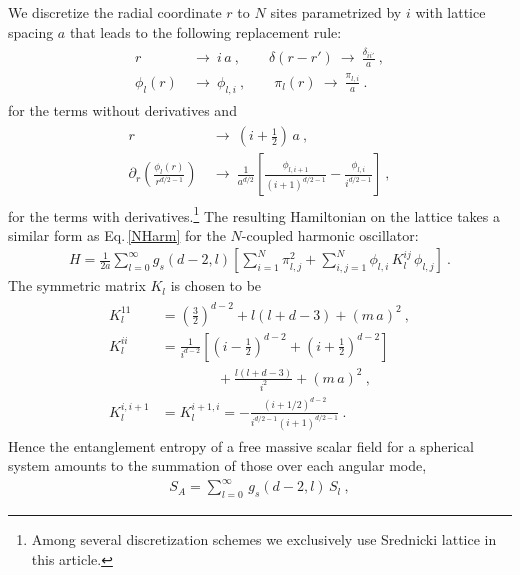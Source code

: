 We discretize the radial coordinate $r$ to $N$ sites parametrized by $i$ with lattice spacing $a$ that leads to the following replacement rule:
\begin{align}
\begin{aligned}
	r& ~\to~ i\, a \ , \qquad \delta(r - r') ~ \to ~ \frac{\delta_{ii'}}{a} \ ,\\
	 \phi_l (r)& ~\to~ \phi_{l,i} \ , \qquad  \pi_l(r) ~\to~ \frac{\pi_{l,i}}{a} \ .
\end{aligned}
\end{align}
for the terms without derivatives and 
\begin{align}
\begin{aligned}
	r& ~\to~ \left(i + \frac{1}{2}\right)\,a \ , \\
	 \partial_r \left( \frac{\phi_l(r)}{r^{d/2 -1}} \right) &~\to~ \frac{1}{a^{d/2}}\left[\frac{\phi_{l,i+1}}{(i+1)^{d/2-1}} - \frac{\phi_{l,i}}{i^{d/2-1}} \right]\ , 
\end{aligned}
\end{align}
for the terms with derivatives.\footnote{Among several discretization schemes we exclusively use Srednicki lattice \cite{Srednicki:1993im} in this article.}
The resulting Hamiltonian on the lattice takes a similar form as Eq.\,\eqref{NHarm} for the $N$-coupled harmonic oscillator:
\begin{align}
	H = \frac{1}{2a} \sum_{l=0}^\infty g_s(d-2,l)  \left[ \sum_{i=1}^N \pi_{l,j}^2 + \sum_{i,j=1}^N \phi_{l,i} \,K_l^{ij} \,\phi_{l,j}\right] \ .
\end{align}
The symmetric matrix $K_l$ is chosen to be
\begin{align}
\begin{aligned}
		K_l^{11} &= \left( \frac{3}{2}\right)^{d-2} + l (l+ d - 3) + (m\,a)^2 \ , \\
		K_l^{ii} &= \frac{1}{i^{d-2}}\left[ \left( i - \frac{1}{2}\right)^{d-2} + \left( i + \frac{1}{2}\right)^{d-2} \right] \\
			&\qquad \qquad  + \frac{l (l+ d - 3)}{i^2} + (m\,a)^2\ , \\
		K_l^{i,i+1} &= K_l^{i+1,i} = - \frac{(i+1/2)^{d-2}}{i^{d/2-1} (i+1)^{d/2-1}}  \ .
\end{aligned}
\end{align}
Hence the entanglement entropy of a free massive scalar field for a spherical system amounts to the summation of those over each angular mode,
\begin{align}\label{EE_Lattice_Scalar}
S_A =  \sum_{l=0}^\infty\, g_s(d-2,l)\,S_l \ ,
\end{align}
